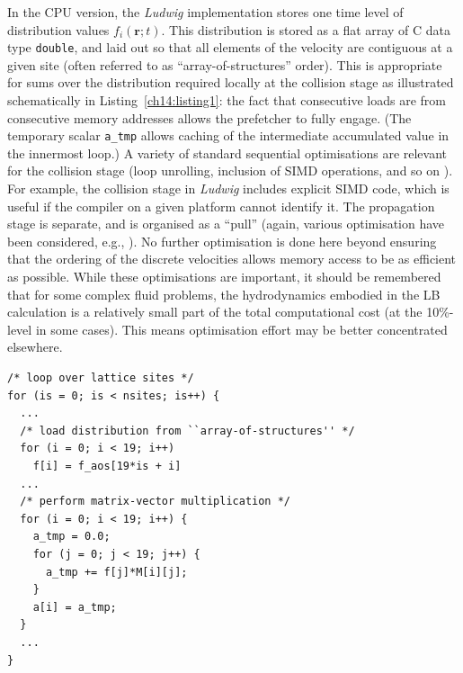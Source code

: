 In the CPU version, the \textit{Ludwig} implementation stores one time
level of distribution values $f_i(\mathbf{r}; t)$. This distribution
is stored as a flat array of C data type \texttt{double}, and laid out
so that all elements of the velocity are contiguous at a given site
(often referred to as ``array-of-structures'' order). This is
appropriate for sums over the distribution required locally at the
collision stage as illustrated schematically in
Listing~\ref{ch14:listing1}: the fact that consecutive loads are from
consecutive memory addresses allows the prefetcher to fully engage.
(The temporary scalar \texttt{a\_tmp} allows caching of the
intermediate accumulated value in the innermost loop.)  A variety of
standard sequential optimisations are relevant for the collision stage
(loop unrolling, inclusion of SIMD operations, and so on
\cite{wellein2006}).  For example, the collision stage in
\textit{Ludwig} includes explicit SIMD code, which is useful if the
compiler on a given platform cannot identify it.  The propagation
stage is separate, and is organised as a ``pull'' (again, various
optimisation have been considered, e.g.,
\cite{pohl2003,mattila2007,wittmann2012}).  No further optimisation is
done here beyond ensuring that the ordering of the discrete velocities
allows memory access to be as efficient as possible. While these
optimisations are important, it should be remembered that for some
complex fluid problems, the hydrodynamics embodied in the LB
calculation is a relatively small part of the total computational cost
(at the 10\%-level in some cases).  This means optimisation effort may
be better concentrated elsewhere.

\begin{lstlisting}[float, label=ch14:listing1,
caption = Collision schematic for CPU.]
/* loop over lattice sites */
for (is = 0; is < nsites; is++) {
  ...
  /* load distribution from ``array-of-structures'' */
  for (i = 0; i < 19; i++)    
    f[i] = f_aos[19*is + i]
  ...
  /* perform matrix-vector multiplication */  
  for (i = 0; i < 19; i++) {    
    a_tmp = 0.0;    
    for (j = 0; j < 19; j++) {      
      a_tmp += f[j]*M[i][j];   
    }
    a[i] = a_tmp;
  }
  ...
}
\end{lstlisting}



